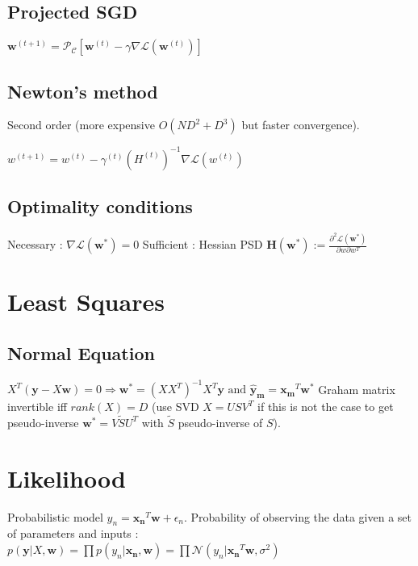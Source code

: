 \subsection{Projected SGD}

$\mathbf{w}^{(t+1)} = \mathcal{P_C} [\mathbf{w}^{(t)} - \gamma \nabla \mathcal{L}(\mathbf{w}^{(t)})]$

\subsection{Newton's method}
Second order (more expensive $O(ND^2 + D^3)$ but faster convergence).

$w^{(t+1)} = w^{(t)} - \gamma^{(t)} (H^{(t)})^{-1} \nabla \mathcal{L}(w^{(t)})$


\subsection{Optimality conditions}
Necessary : $\nabla \mathcal{L} (\mathbf{w}^*) = 0$
Sufficient : Hessian PSD $\mathbf{H}(\mathbf{w}^*) := \frac{\partial^2 \mathcal{L}(\mathbf{w}^*)}{\partial w \partial w^T}$


\section{Least Squares}
\subsection{Normal Equation}
$X^T (\mathbf{y} - X\mathbf{w})= 0 \Rightarrow$\newline$\mathbf{w^*} = (XX^T)^{-1}X^T\mathbf{y} \text{ and } \mathbf{\hat{y}_m} = \mathbf{x_m}^T \mathbf{w^*}$
Graham matrix invertible iff $rank(X) = D$ (use SVD $X = USV^T$ if this is not the case to get pseudo-inverse $\mathbf{w^*} = V\tilde{S}U^T$ with $\tilde{S}$ pseudo-inverse of $S$).

\section{Likelihood}
Probabilistic model $y_n = \mathbf{x_n}^T\mathbf{w} + \epsilon_n$.
Probability of observing the data given a set of parameters and inputs :
$p(\mathbf{y}|X, \mathbf{w}) = \prod p(y_n|\mathbf{x_n}, \mathbf{w})  = \prod \mathcal{N} (y_n | \mathbf{x_n}^T\mathbf{w}, \sigma^2)$

